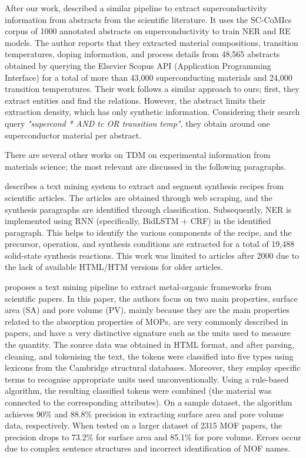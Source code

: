 After our work, \cite{mitsui2023automatic} described a similar pipeline to extract superconductivity information from abstracts from the scientific literature.
It uses the SC-CoMIcs~\cite{yamaguchi-etal-2020-sc} corpus of 1000 annotated abstracts on superconductivity to train NER and RE models.
The author reports that they extracted material compositions, transition temperatures, doping information, and process details from 48,565 abstracts obtained by querying the Elsevier Scopus API (Application Programming Interface) for a total of more than 43,000 superconducting materials and 24,000 transition temperatures. 
Their work follows a similar approach to ours; first, they extract entities and find the relations. 
However, the abstract limits their extraction density, which has only synthetic information. Considering their search query \textit{"supercond * AND tc OR transition temp"}, they obtain around one superconductor material per abstract. 

There are several other works on TDM on experimental information from materials science; the most relevant are discussed in the following paragraphs. 

\cite{kononova2019text} describes a text mining system to extract and segment synthesis recipes from scientific articles. The articles are obtained through web scraping, and the synthesis paragraphs are identified through classification. Subsequently, NER is implemented using RNN (specifically, BidLSTM + CRF) in the identified paragraph. This helps to identify the various components of the recipe, and the precursor, operation, and synthesis conditions are extracted for a total of 19,488 solid-state synthesis reactions.
This work was limited to articles after 2000 due to the lack of available HTML/HTM versions for older articles.

\cite{park2018text} proposes a text mining pipeline to extract metal-organic frameworks from scientific papers. In this paper, the authors focus on two main properties, surface area (SA) and pore volume (PV), mainly because they are the main properties related to the absorption properties of MOPs, are very commonly described in papers, and have a very distinctive signature such as the units used to measure the quantity. 
The source data was obtained in HTML format, and after parsing, cleaning, and tokenising the text, the tokens were classified into five types using lexicons from the Cambridge structural databases. 
Moreover, they employ specific terms to recognise appropriate units used unconventionally. Using a rule-based algorithm, the resulting classified tokens were combined (the material was connected to the corresponding attributes).
On a sample dataset, the algorithm achieves 90\% and 88.8\% precision in extracting surface area and pore volume data, respectively.
When tested on a larger dataset of 2315 MOF papers, the precision drops to 73.2\% for surface area and 85.1\% for pore volume. Errors occur due to complex sentence structures and incorrect identification of MOF names.

